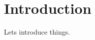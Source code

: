 \documentclass[../masters.tex]{subfiles}
\begin{document}
\graphicspath{{./imgs/}{../imgs/}} %

\section{Introduction}
Lets introduce things.


%
%
\end{document}
